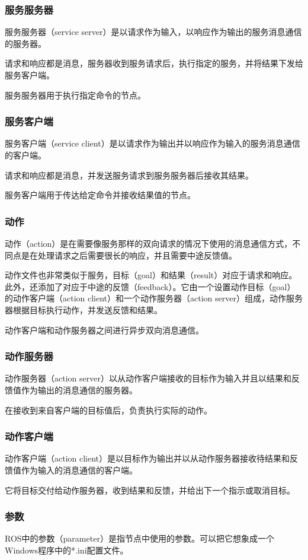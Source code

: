\documentclass[geye,green,kindle,cn]{elegantnote}
\begin{document}
\subsubsection{服务服务器}
服务服务器（service server）是以请求作为输入，以响应作为输出的服务消息通信的服务器。

请求和响应都是消息，服务器收到服务请求后，执行指定的服务，并将结果下发给服务客户端。

服务服务器用于执行指定命令的节点。
\subsubsection{服务客户端}
服务客户端（service client）是以请求作为输出并以响应作为输入的服务消息通信的客户端。

请求和响应都是消息，并发送服务请求到服务服务器后接收其结果。

服务客户端用于传达给定命令并接收结果值的节点。
\subsubsection{动作}
动作（action）是在需要像服务那样的双向请求的情况下使用的消息通信方式，不同点是在处理请求之后需要很长的响应，并且需要中途反馈值。

动作文件也非常类似于服务，目标（goal）和结果（result）对应于请求和响应。此外，还添加了对应于中途的反馈（feedback）。它由一个设置动作目标（goal）的动作客户端（action client）和一个动作服务器（action server）组成，动作服务器根据目标执行动作，并发送反馈和结果。

动作客户端和动作服务器之间进行异步双向消息通信。
\subsubsection{动作服务器}
动作服务器（action server）以从动作客户端接收的目标作为输入并且以结果和反馈值作为输出的消息通信的服务器。

在接收到来自客户端的目标值后，负责执行实际的动作。
\subsubsection{动作客户端}
动作客户端（action client）是以目标作为输出并以从动作服务器接收待结果和反馈值作为输入的消息通信的客户端。

它将目标交付给动作服务器，收到结果和反馈，并给出下一个指示或取消目标。
\subsubsection{参数}
ROS中的参数（parameter）是指节点中使用的参数。可以把它想象成一个Windows程序中的*.ini配置文件。
\end{document}
